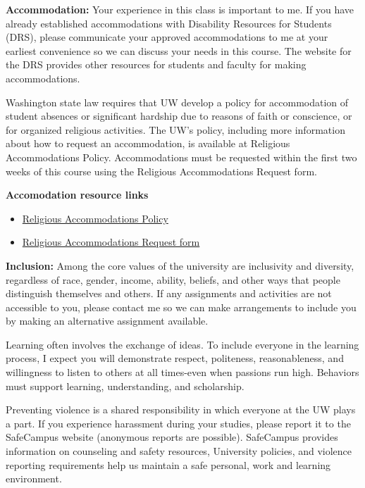 \documentclass[
]{book}
\providecommand{\tightlist}{%
  \setlength{\itemsep}{0pt}\setlength{\parskip}{0pt}}
\begin{document}
\textbf{Accommodation:} Your experience in this class is important to me. If you have already established accommodations with Disability Resources for Students (DRS), please communicate your approved accommodations to me at your earliest convenience so we can discuss your needs in this course. The website for the DRS provides other resources for students and faculty for making accommodations.

Washington state law requires that UW develop a policy for accommodation of student absences or significant hardship due to reasons of faith or conscience, or for organized religious activities. The UW's policy, including more information about how to request an accommodation, is available at Religious Accommodations Policy. Accommodations must be requested within the first two weeks of this course using the Religious Accommodations Request form.

\textbf{Accomodation resource links}

\begin{itemize}
\tightlist
\item
  \href{https://registrar.washington.edu/staffandfaculty/religious-accommodations-policy/}{Religious Accommodations Policy}
\item
  \href{https://registrar.washington.edu/students/religious-accommodations-request/}{Religious Accommodations Request form}
\end{itemize}

\textbf{Inclusion:} Among the core values of the university are inclusivity and diversity, regardless of race, gender, income, ability, beliefs, and other ways that people distinguish themselves and others. If any assignments and activities are not accessible to you, please contact me so we can make arrangements to include you by making an alternative assignment available.

Learning often involves the exchange of ideas. To include everyone in the learning process, I expect you will demonstrate respect, politeness, reasonableness, and willingness to listen to others at all times-even when passions run high. Behaviors must support learning, understanding, and scholarship.

Preventing violence is a shared responsibility in which everyone at the UW plays a part. If you experience harassment during your studies, please report it to the SafeCampus website (anonymous reports are possible). SafeCampus provides information on counseling and safety resources, University policies, and violence reporting requirements help us maintain a safe personal, work and learning environment.
\end{document}
